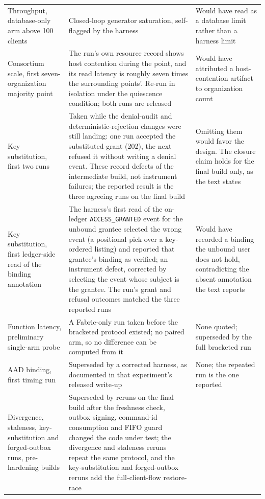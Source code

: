 \documentclass[preprint,12pt]{elsarticle}
\begin{document}
{\begin{longtable}{@{}>{\raggedright\arraybackslash}p{}%
                 >{\raggedright\arraybackslash}p{}%
                 >{\raggedright\arraybackslash}p{}@{}}
\addlinespace
Throughput, database-only arm above 100 clients &
Closed-loop generator saturation, self-flagged by the harness &
Would have read as a database limit rather than a harness limit \\
\addlinespace
Consortium scale, first seven-organization majority point &
The run's own resource record shows host contention during the point, and its
read latency is roughly seven times the surrounding points'. Re-run in
isolation under the quiescence condition; both runs are released &
Would have attributed a host-contention artifact to organization count \\
\addlinespace
Key substitution, first two runs &
Taken while the denial-audit and deterministic-rejection changes were still
landing: one run accepted the substituted grant (202), the next refused it
without writing a denial event. These record defects of the intermediate
build, not instrument failures; the reported result is the three agreeing runs
on the final build &
Omitting them would favor the design. The closure claim holds for the final
build only, as the text states \\
\addlinespace
Key substitution, first ledger-side read of the binding annotation &
The harness's first read of the on-ledger \texttt{ACCESS\_GRANTED} event for
the unbound grantee selected the wrong event (a positional pick over a
key-ordered listing) and reported that grantee's binding as verified; an
instrument defect, corrected by selecting the event whose subject is the
grantee. The run's grant and refusal outcomes matched the three reported
runs &
Would have recorded a binding the unbound user does not hold, contradicting
the absent annotation the text reports \\
\addlinespace
Function latency, preliminary single-arm probe &
A Fabric-only run taken before the bracketed protocol existed; no paired arm,
so no difference can be computed from it &
None quoted; superseded by the full bracketed run \\
\addlinespace
AAD binding, first timing run &
Superseded by a corrected harness, as documented in that experiment's released
write-up &
None; the repeated run is the one reported \\
\addlinespace
Divergence, staleness, key-substitution and forged-outbox runs, pre-hardening builds &
Superseded by reruns on the final build after the freshness check, outbox
signing, command-id consumption and FIFO guard changed the code under test;
the divergence and staleness reruns repeat the same protocol, and the
key-substitution and forged-outbox reruns add the full-client-flow restore-race

\end{longtable}}
\end{document}
